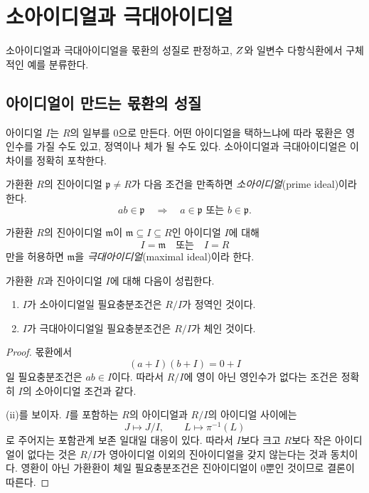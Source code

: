 \section{소아이디얼과 극대아이디얼}
\label{sec:ring-prime-maximal}

\begin{learninggoal}
소아이디얼과 극대아이디얼을 몫환의 성질로 판정하고, $Z$와 일변수 다항식환에서 구체적인 예를 분류한다.
\end{learninggoal}

\subsection{아이디얼이 만드는 몫환의 성질}

아이디얼 $I$는 $R$의 일부를 $0$으로 만든다. 어떤 아이디얼을 택하느냐에 따라 몫환은 영인수를 가질 수도 있고, 정역이나 체가 될 수도 있다. 소아이디얼과 극대아이디얼은 이 차이를 정확히 포착한다.

\begin{definition}[소아이디얼]
가환환 $R$의 진아이디얼 $\mathfrak p\ne R$가 다음 조건을 만족하면 \emph{소아이디얼}(prime ideal)이라 한다.
\[
  ab\in\mathfrak p
  \quad\Longrightarrow\quad
  a\in\mathfrak p\text{ 또는 }b\in\mathfrak p.
\]
\end{definition}

\begin{definition}[극대아이디얼]
가환환 $R$의 진아이디얼 $\mathfrak m$이 $\mathfrak m\subseteq I\subseteq R$인 아이디얼 $I$에 대해
\[
  I=\mathfrak m\quad\text{또는}\quad I=R
\]
만을 허용하면 $\mathfrak m$을 \emph{극대아이디얼}(maximal ideal)이라 한다.
\end{definition}

\begin{theorem}[몫환 판정법]
가환환 $R$과 진아이디얼 $I$에 대해 다음이 성립한다.
\begin{enumerate}[label=(\roman*)]
  \item $I$가 소아이디얼일 필요충분조건은 $R/I$가 정역인 것이다.
  \item $I$가 극대아이디얼일 필요충분조건은 $R/I$가 체인 것이다.
\end{enumerate}
\end{theorem}

\begin{proof}
몫환에서
\[
  (a+I)(b+I)=0+I
\]
일 필요충분조건은 $ab\in I$이다. 따라서 $R/I$에 영이 아닌 영인수가 없다는 조건은 정확히 $I$의 소아이디얼 조건과 같다.

(ii)를 보이자. $I$를 포함하는 $R$의 아이디얼과 $R/I$의 아이디얼 사이에는
\[
  J\longmapsto J/I,\qquad
  L\longmapsto\pi^{-1}(L)
\]
로 주어지는 포함관계 보존 일대일 대응이 있다. 따라서 $I$보다 크고 $R$보다 작은 아이디얼이 없다는 것은 $R/I$가 영아이디얼 이외의 진아이디얼을 갖지 않는다는 것과 동치이다. 영환이 아닌 가환환이 체일 필요충분조건은 진아이디얼이 $0$뿐인 것이므로 결론이 따른다.
\end{proof}

